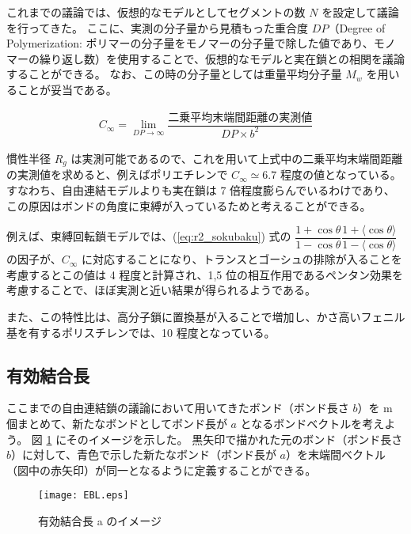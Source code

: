 \documentclass[a4paper,11pt]{ltjsarticle}
\begin{document}
これまでの議論では、仮想的なモデルとしてセグメントの数 $N$ を設定して議論を行ってきた。
ここに、実測の分子量から見積もった重合度 $DP$（Degree of Polymerization: ポリマーの分子量をモノマーの分子量で除した値であり、モノマーの繰り返し数）を使用することで、仮想的なモデルと実在鎖との相関を議論することができる。
なお、この時の分子量としては重量平均分子量 $M_w$ を用いることが妥当である。

\begin{align}
C_{\infty} = \lim_{DP \to \infty} \dfrac{ \text{二乗平均末端間距離の実測値} }{DP \times b^2}
\label{fig:CR}
\end{align}

慣性半径 $R_g$ は実測可能であるので、これを用いて上式中の二乗平均末端間距離の実測値を求めると、例えばポリエチレンで $C_{\infty} \simeq 6.7$ 程度の値となっている。
すなわち、自由連結モデルよりも実在鎖は 7 倍程度膨らんでいるわけであり、この原因はボンドの角度に束縛が入っているためと考えることができる。

例えば、束縛回転鎖モデルでは、(\ref{eq:r2_sokubaku}) 式の $\dfrac{1+\cos \theta}{1-\cos \theta} \dfrac{1+ \langle \cos \theta \rangle}{1- \langle \cos \theta \rangle}$ の因子が、$C_{\infty}$ に対応することになり、トランスとゴーシュの排除が入ることを考慮するとこの値は 4 程度と計算され、1,5 位の相互作用であるペンタン効果を考慮することで、ほぼ実測と近い結果が得られるようである。

また、この特性比は、高分子鎖に置換基が入ることで増加し、かさ高いフェニル基を有するポリスチレンでは、10 程度となっている。



\subsection{有効結合長}

ここまでの自由連結鎖の議論において用いてきたボンド（ボンド長さ $b$）を m 個まとめて、新たなボンドとしてボンド長が $a$ となるボンドベクトルを考えよう。
図 \ref{fig: EBL} にそのイメージを示した。
黒矢印で描かれた元のボンド（ボンド長さ $b$）に対して、青色で示した新たなボンド（ボンド長が $a$）を末端間ベクトル（図中の赤矢印）が同一となるように定義することができる。
\begin{figure}[htb]
 \centering
	\texttt{[image: EBL.eps]}
	\caption{有効結合長 a のイメージ}
	\label{fig: EBL}
\end{figure}
\end{document}
